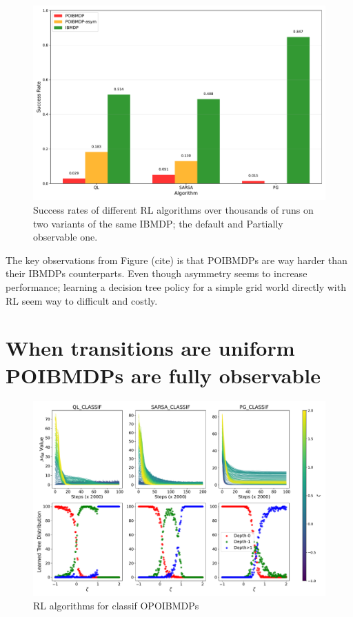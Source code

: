 \begin{figure}
    \centering
    \includegraphics[width=1\textwidth]{images/images_part1/algorithm_performance_comparison_flattened.pdf}
    \caption{Success rates of different RL algorithms over thousands of runs on two variants of the same IBMDP; the default and Partially observable one.}\label{fig:po-vs-ib}
\end{figure}

The key observations from Figure (cite) is that POIBMDPs are way harder than their IBMDPs counterparts.
Even though asymmetry seems to increase performance; learning a decision tree policy for a simple grid world directly with RL seem way to difficult and costly.

\chapter{When transitions are uniform POIBMDPs are fully observable}
\begin{figure}
    \centering
    \includegraphics[width=1\textwidth]{images/images_part1/quick_plot_combined_classif.pdf}
    \caption{RL algorithms for classif OPOIBMDPs}\label{fig:rl-poibmdp}
\end{figure}

